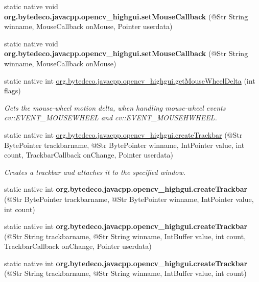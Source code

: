 \begin{DoxyCompactItemize}
static native void {\bfseries org.\+bytedeco.\+javacpp.\+opencv\+\_\+highgui.\+set\+Mouse\+Callback} (@Str String winname, Mouse\+Callback on\+Mouse, Pointer userdata)
\item 
\mbox{\label{group__highgui_gaf02a913c87f5a02429d836be5d58e2cf}} 
static native void {\bfseries org.\+bytedeco.\+javacpp.\+opencv\+\_\+highgui.\+set\+Mouse\+Callback} (@Str String winname, Mouse\+Callback on\+Mouse)
\item 
static native int \hyperlink{group__highgui_gaf78c2cffa388987b42b78f0c122e5ef9}{org.\+bytedeco.\+javacpp.\+opencv\+\_\+highgui.\+get\+Mouse\+Wheel\+Delta} (int flags)
\begin{DoxyCompactList}\small\item\em Gets the mouse-\/wheel motion delta, when handling mouse-\/wheel events cv\+::\+E\+V\+E\+N\+T\+\_\+\+M\+O\+U\+S\+E\+W\+H\+E\+EL and cv\+::\+E\+V\+E\+N\+T\+\_\+\+M\+O\+U\+S\+E\+H\+W\+H\+E\+EL. \end{DoxyCompactList}\item 
static native int \hyperlink{group__highgui_ga727bcca32e6bc9d52ae86894538318fa}{org.\+bytedeco.\+javacpp.\+opencv\+\_\+highgui.\+create\+Trackbar} (@Str Byte\+Pointer trackbarname, @Str Byte\+Pointer winname, Int\+Pointer value, int count, Trackbar\+Callback on\+Change, Pointer userdata)
\begin{DoxyCompactList}\small\item\em Creates a trackbar and attaches it to the specified window. \end{DoxyCompactList}\item 
\mbox{\label{group__highgui_gab173b8a8c312e944882a4179f9520172}} 
static native int {\bfseries org.\+bytedeco.\+javacpp.\+opencv\+\_\+highgui.\+create\+Trackbar} (@Str Byte\+Pointer trackbarname, @Str Byte\+Pointer winname, Int\+Pointer value, int count)
\item 
\mbox{\label{group__highgui_gaf9156030114d1488db0f4995adbd35a5}} 
static native int {\bfseries org.\+bytedeco.\+javacpp.\+opencv\+\_\+highgui.\+create\+Trackbar} (@Str String trackbarname, @Str String winname, Int\+Buffer value, int count, Trackbar\+Callback on\+Change, Pointer userdata)
\item 
\mbox{\label{group__highgui_ga74eef9d5d6eab77f3602ecc2fa8b635d}} 
static native int {\bfseries org.\+bytedeco.\+javacpp.\+opencv\+\_\+highgui.\+create\+Trackbar} (@Str String trackbarname, @Str String winname, Int\+Buffer value, int count)

\end{DoxyCompactItemize}
